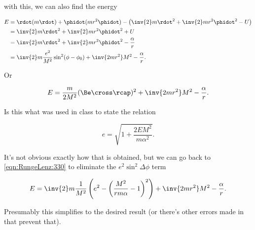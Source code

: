 with this, we can also find the energy

\begin{align*}
E 
&= \rdot( m \rdot) + \phidot ( m r^2 \phidot) - \left( \inv{2} m \rdot^2 + \inv{2} m r^2 \phidot^2 - U \right) \\
&= \inv{2} m \rdot^2 + \inv{2} m r^2 \phidot^2 + U  \\
&= \inv{2} m \rdot^2 + \inv{2} m r^2 \phidot^2 - \frac{\alpha}{r} \\
&= \inv{2} m \frac{e^2}{M^2} \sin^2(\phi - \phi_0) + \inv{2 m r^2 } M^2 - \frac{\alpha}{r}.
\end{align*}

Or

\begin{equation}\label{eqn:RungeLenz:390}
E
= \frac{m}{2 M^2} (\Be \cross \rcap)^2 + \inv{2 m r^2 } M^2 - \frac{\alpha}{r}.
\end{equation}

Is this what was used in class to state the relation

\begin{equation}\label{eqn:RungeLenz:410}
e = \sqrt{1 + \frac{2 E M^2}{m \alpha^2}}.
\end{equation}

It's not obvious exactly how that is obtained, but we can go back to \ref{eqn:RungeLenz:330} to eliminate the $e^2 \sin^2 \Delta \phi$ term

\begin{equation}\label{eqn:RungeLenz:n}
E 
= \inv{2} m \frac{1}{M^2} \left( e^2 - \left( \frac{M^2}{r m \alpha} - 1\right)^2 \right) + \inv{2 m r^2 } M^2 - \frac{\alpha}{r}.
\end{equation}

Presumably this simplifies to the desired result (or there's other errors made in that prevent that).

\EndNoBibArticle
